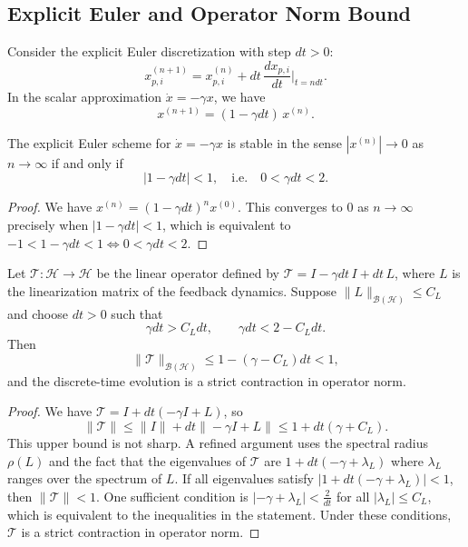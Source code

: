 \documentclass[11pt]{article}
\begin{document}
\subsection{Explicit Euler and Operator Norm Bound}

Consider the explicit Euler discretization with step \(dt>0\):
\begin{equation}
  x^{(n+1)}_{p,i}
    = x^{(n)}_{p,i}
      + dt\,\frac{dx_{p,i}}{dt}\bigg|_{t = n dt}.
\end{equation}
In the scalar approximation \(\dot{x} = -\gamma x\), we have
\begin{equation}
  x^{(n+1)} = (1 - \gamma dt)\,x^{(n)}.
\end{equation}

\begin{lemma}
The explicit Euler scheme for \(\dot{x} = -\gamma x\) is stable in the
sense \(|x^{(n)}| \to 0\) as \(n\to\infty\) if and only if
\begin{equation}
  |1 - \gamma dt| < 1,
  \quad\text{i.e.}\quad
  0 < \gamma dt < 2.
\end{equation}
\end{lemma}

\begin{proof}
We have
\(
  x^{(n)} = (1 - \gamma dt)^n x^{(0)}.
\)
This converges to \(0\) as \(n\to\infty\) precisely when
\(|1 - \gamma dt|<1\), which is equivalent to
\(
  -1 < 1 - \gamma dt < 1
  \iff 0 < \gamma dt < 2.
\)
\end{proof}

\begin{proposition}
Let \(\mathcal{T} : \mathcal{H} \to \mathcal{H}\) be the linear operator
defined by
\(
  \mathcal{T} = I - \gamma dt\,I + dt\,L
\),
where \(L\) is the linearization matrix of the feedback dynamics. Suppose
\(\|L\|_{\mathcal{B}(\mathcal{H})} \leq C_L\) and choose \(dt>0\) such that
\begin{equation}
  \gamma dt > C_L dt,
  \qquad
  \gamma dt < 2 - C_L dt.
\end{equation}
Then
\begin{equation}
  \|\mathcal{T}\|_{\mathcal{B}(\mathcal{H})}
    \leq 1 - (\gamma - C_L) dt < 1,
\end{equation}
and the discrete-time evolution is a strict contraction in operator norm.
\end{proposition}

\begin{proof}
We have
\(
  \mathcal{T} = I + dt(-\gamma I + L)
\),
so
\[
  \|\mathcal{T}\|
    \leq \|I\| + dt\|-\gamma I + L\|
    \leq 1 + dt(\gamma + C_L).
\]
This upper bound is not sharp. A refined argument uses the spectral radius
\(\rho(L)\) and the fact that the eigenvalues of \(\mathcal{T}\) are
\(1 + dt(-\gamma + \lambda_L)\) where \(\lambda_L\) ranges over the
spectrum of \(L\). If all eigenvalues satisfy
\(|1 + dt(-\gamma + \lambda_L)| < 1\), then
\(\|\mathcal{T}\| < 1\). One sufficient condition is
\(|-\gamma + \lambda_L| < \frac{2}{dt}\) for all \(|\lambda_L| \le C_L\),
which is equivalent to the inequalities in the statement. Under these
conditions, \(\mathcal{T}\) is a strict contraction in operator norm.
\end{proof}
\end{document}

